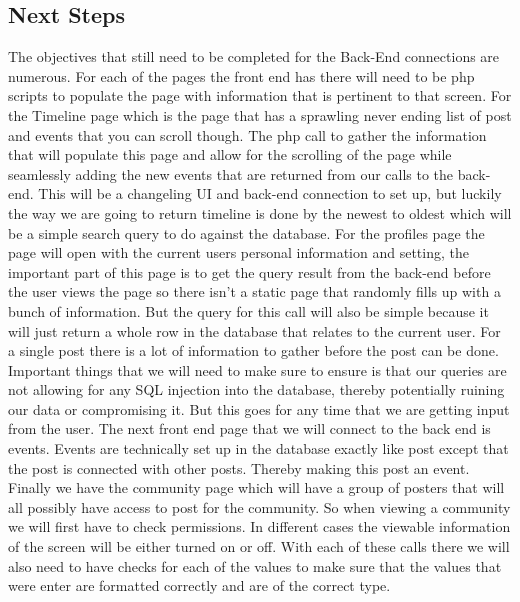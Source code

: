 \documentclass[compsoc, 10, draftclsnofoot, onecolumn]{IEEEtran}
\begin{document}
\subsection{Next Steps}
The objectives that still need to be completed for the Back-End connections are numerous. For each of the pages the front end has there will need to be php scripts to populate the page with information that is pertinent to that screen. For the Timeline page which is the page that has a sprawling never ending list of post and events that you can scroll though. The php call to gather the information that will populate this page and allow for the scrolling of the page while seamlessly adding the new events that are returned from our calls to the back-end. This will be a changeling UI and back-end connection to set up, but luckily the way we are going to return timeline is done by the newest to oldest which will be a simple search query to do against the database. For the profiles page the page will open with the current users personal information and setting, the important part of this page is to get the query result from the back-end before the user views the page so there isn't a static page that randomly fills up with a bunch of information. But the query for this call will also be simple because it will just return a whole row in the database that relates to the current user. For a single post there is a lot of information to gather before the post can be done. Important things that we will need to make sure to ensure is that our queries are not allowing for any SQL injection into the database, thereby potentially ruining our data or compromising it. But this goes for any time that we are getting input from the user. The next front end page that we will connect to the back end is events. Events are technically set up in the database exactly like post except that the post is connected with other posts. Thereby making this post an event. Finally we have the community page which will have a group of posters that will all possibly have access to post for the community. So when viewing a community we will first have to check permissions. In different cases the viewable information of the screen will be either turned on or off. With each of these calls there we will also need to have checks for each of the values to make sure that the values that were enter are formatted correctly and are of the correct type. 
\end{document}
